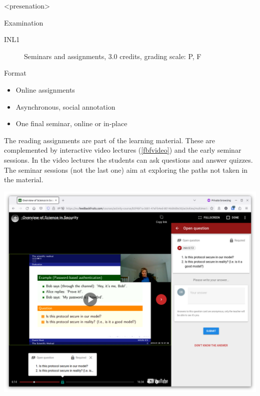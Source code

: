 \mode<presenation>{%
\begin{frame}[fragile]
  \begin{block}{Examination}
    \begin{description}
      \item[INL1] Seminars and assignments, 3.0 credits, grading scale: P, F
    \end{description}
  \end{block}

  \pause

  \begin{block}{Format}
    \begin{itemize}
      \item Online assignments
      \item Asynchronous, social annotation
      \item One final seminar, online or in-place
    \end{itemize}
  \end{block}
\end{frame}
}

The reading assignments are part of the learning material.
These are complemented by interactive video lectures (\cref{fbfvideo}) and the 
early seminar sessions.
In the video lectures the students can ask questions and answer quizzes.
The seminar sessions (not the last one) aim at exploring the paths not taken in 
the material.

\begin{marginfigure}
  \includegraphics[width=\columnwidth]{figs/fbf-video-quiz.png}
  \caption{%
    An interactive video in FeedbackFruits where one can answer quiz 
    questions posed in the video.%
  }\label{fbfvideo}
\end{marginfigure}


